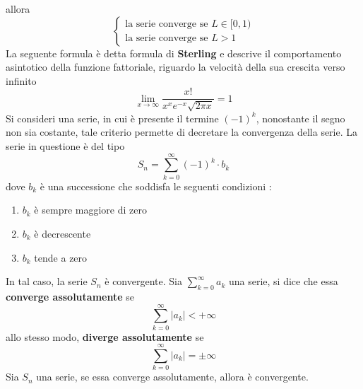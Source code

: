 \documentclass[10pt, letterpaper]{report}
\begin{document}
allora $$\begin{cases}
        \text{la serie converge se } L\in [0,1) \\
        \text{la serie converge se } L>1
    \end{cases}
$$
La seguente formula è detta formula di \textbf{Sterling} e descrive
il comportamento asintotico della funzione fattoriale, riguardo la velocità
della sua crescita verso infinito
$$
    \lim_{x\rightarrow \infty} \dfrac{x!}{x^xe^{-x}\sqrt{2\pi x}}=1
$$
 Si consideri una serie, in cui è presente
il termine $(-1)^k$, nonostante il segno non sia costante, tale criterio permette
di decretare la convergenza della serie. La serie in questione è del tipo
$$ S_n=\sum_{k=0}^\infty (-1)^k\cdot b_k$$
dove $b_k$ è una successione che soddisfa le seguenti condizioni : \begin{enumerate}
    \item $b_k$ è sempre maggiore di zero
    \item $b_k$ è decrescente
    \item $b_k$ tende a zero
\end{enumerate}
In tal caso, la serie $S_n$ è convergente.\acc
Sia $\sum_{k=0}^\infty a_k$ una serie, si dice che essa
\textbf{converge assolutamente} se
$$ \sum_{k=0}^\infty |a_k|<+\infty$$
allo stesso modo, \textbf{diverge assolutamente} se
$$ \sum_{k=0}^\infty |a_k|=\pm\infty$$
\teo{}Sia $S_n$ una serie, se essa converge assolutamente, allora è convergente.
\newpage
\end{document}
